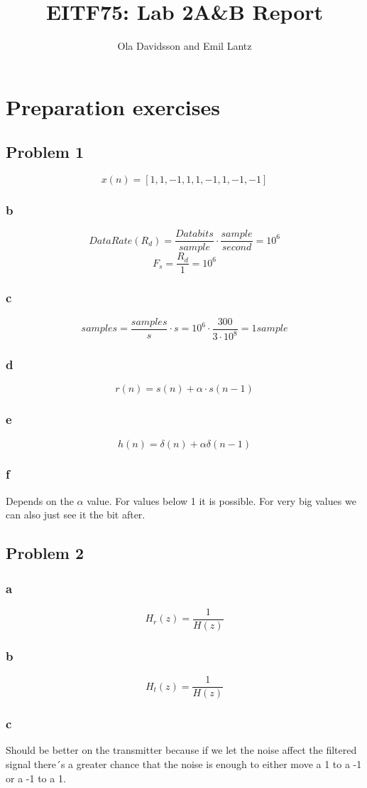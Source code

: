 \documentclass[a4paper,11pt]{article}
\title{EITF75: Lab 2A&B Report}
\author{Ola Davidsson and Emil Lantz}
\begin{document}
\raggedright
\maketitle
\section{Preparation exercises}
\subsection{Problem 1}
\[
x(n) = [1, 1, -1, 1, 1, -1, 1, -1, -1]
\]
\subsubsection{b}
\[
Data Rate (R_d) = \frac{Data bits}{sample}\cdot\frac{sample}{second} = 10^{6}
\]
\[
F_s = \frac{R_d}{1} = 10^6
\]
\subsubsection{c}
\[
samples = \frac{samples}{s}\cdot s = 10^6\cdot\frac{300}{3\cdot10^8} = 1 sample
\]
\subsubsection{d}
\[
r(n) = s(n) + \alpha\cdot s(n-1)
\]
\subsubsection{e}
\[
h(n) = \delta (n) + \alpha\delta(n-1)
\]
\subsubsection{f}
Depends on the $\alpha$ value. For values below 1 it is possible. For very big values we can also just see it the bit after. 
\subsection{Problem 2}
\subsubsection{a}
\[
H_r(z) = \frac{1}{H(z)}
\]
\subsubsection{b}
\[
H_t(z) = \frac{1}{H(z)} 
\]
\subsubsection{c}
Should be better on the transmitter because if we let the noise affect the filtered signal there´s a greater chance that the noise is enough to either move a 1 to a -1 or a -1 to a 1. 
\end{document}
